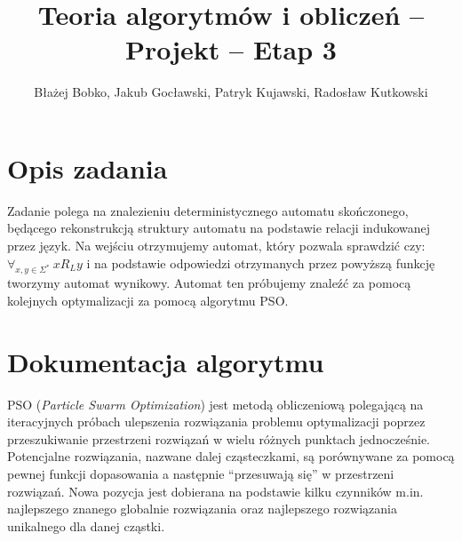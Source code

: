 \documentclass{../llncs_template_final/llncs}
\begin{document}
\title{Teoria algorytmów i obliczeń -- Projekt -- Etap 3}
\author{Błażej Bobko, Jakub Gocławski, Patryk Kujawski, Radosław Kutkowski}
\maketitle 


\section{Opis zadania}

Zadanie polega na znalezieniu deterministycznego automatu skończonego, będącego rekonstrukcją struktury automatu na podstawie relacji indukowanej przez język. Na wejściu otrzymujemy automat, który pozwala sprawdzić czy: $\forall _{x,y \in \Sigma^*}\ x R_L y$ i na podstawie odpowiedzi otrzymanych przez powyższą funkcję tworzymy automat wynikowy. Automat ten próbujemy znaleźć za pomocą kolejnych optymalizacji za pomocą algorytmu PSO.

\section{Dokumentacja algorytmu}

PSO (\emph{Particle Swarm Optimization}) jest metodą obliczeniową polegającą na iteracyjnych próbach ulepszenia rozwiązania problemu optymalizacji poprzez przeszukiwanie przestrzeni rozwiązań w wielu różnych punktach jednocześnie. Potencjalne rozwiązania, nazwane dalej cząsteczkami, są porównywane za pomocą pewnej funkcji dopasowania a następnie “przesuwają się” w przestrzeni rozwiązań. Nowa pozycja jest dobierana na podstawie kilku czynników m.in. najlepszego znanego globalnie rozwiązania oraz najlepszego rozwiązania unikalnego dla danej cząstki. 
\end{document}
